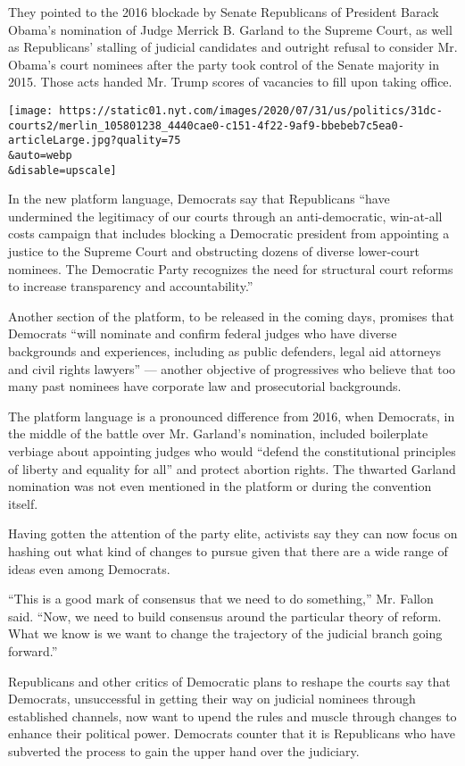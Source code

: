 They pointed to the 2016 blockade by Senate Republicans of President
Barack Obama's nomination of Judge Merrick B. Garland to the Supreme
Court, as well as Republicans' stalling of judicial candidates and
outright refusal to consider Mr. Obama's court nominees after the party
took control of the Senate majority in 2015. Those acts handed Mr. Trump
scores of vacancies to fill upon taking office.

\texttt{[image: https://static01.nyt.com/images/2020/07/31/us/politics/31dc-courts2/merlin\_105801238\_4440cae0-c151-4f22-9af9-bbebeb7c5ea0-articleLarge.jpg?quality=75\\\&auto=webp\\\&disable=upscale]}

In the new platform language, Democrats say that Republicans ``have
undermined the legitimacy of our courts through an anti-democratic,
win-at-all costs campaign that includes blocking a Democratic president
from appointing a justice to the Supreme Court and obstructing dozens of
diverse lower-court nominees. The Democratic Party recognizes the need
for structural court reforms to increase transparency and
accountability.''

Another section of the platform, to be released in the coming days,
promises that Democrats ``will nominate and confirm federal judges who
have diverse backgrounds and experiences, including as public defenders,
legal aid attorneys and civil rights lawyers'' --- another objective of
progressives who believe that too many past nominees have corporate law
and prosecutorial backgrounds.

The platform language is a pronounced difference from 2016, when
Democrats, in the middle of the battle over Mr. Garland's nomination,
included boilerplate verbiage about appointing judges who would ``defend
the constitutional principles of liberty and equality for all'' and
protect abortion rights. The thwarted Garland nomination was not even
mentioned in the platform or during the convention itself.

Having gotten the attention of the party elite, activists say they can
now focus on hashing out what kind of changes to pursue given that there
are a wide range of ideas even among Democrats.

``This is a good mark of consensus that we need to do something,'' Mr.
Fallon said. ``Now, we need to build consensus around the particular
theory of reform. What we know is we want to change the trajectory of
the judicial branch going forward.''

Republicans and other critics of Democratic plans to reshape the courts
say that Democrats, unsuccessful in getting their way on judicial
nominees through established channels, now want to upend the rules and
muscle through changes to enhance their political power. Democrats
counter that it is Republicans who have subverted the process to gain
the upper hand over the judiciary.

